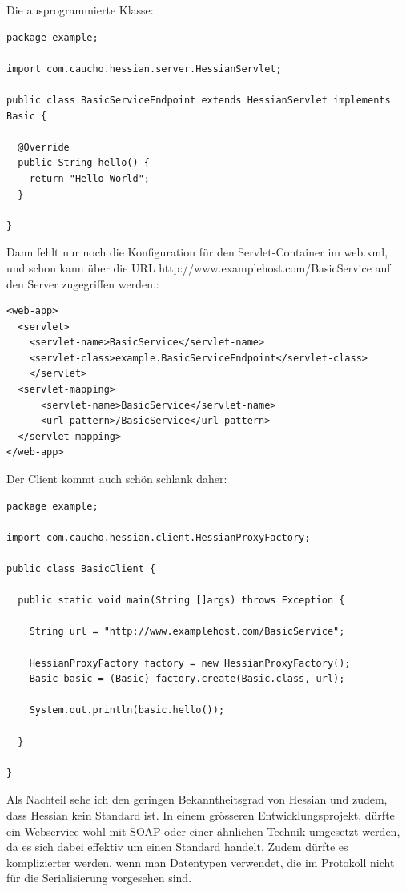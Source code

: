 \documentclass[abstracton, listof=totocnumbered,
bibliography=totocnumbered]{scrreprt}
\begin{document}
  Die ausprogrammierte Klasse:

\begin{verbatim}
package example;  
  
import com.caucho.hessian.server.HessianServlet;

public class BasicServiceEndpoint extends HessianServlet implements Basic {

  @Override
  public String hello() {
    return "Hello World";
  }
      
}
\end{verbatim}

  Dann fehlt nur noch die Konfiguration für den Servlet-Container im web.xml,
  und schon kann über die \ac{URL} http://www.examplehost.com/BasicService auf
  den Server zugegriffen werden.:
  
\begin{verbatim}
<web-app>  
  <servlet>
    <servlet-name>BasicService</servlet-name>
    <servlet-class>example.BasicServiceEndpoint</servlet-class>
    </servlet>
  <servlet-mapping>
      <servlet-name>BasicService</servlet-name>
      <url-pattern>/BasicService</url-pattern>
  </servlet-mapping>
</web-app>
\end{verbatim}

  Der Client kommt auch schön schlank daher:

\begin{verbatim}  
package example;

import com.caucho.hessian.client.HessianProxyFactory;

public class BasicClient {

  public static void main(String []args) throws Exception {
  
    String url = "http://www.examplehost.com/BasicService";

    HessianProxyFactory factory = new HessianProxyFactory();
    Basic basic = (Basic) factory.create(Basic.class, url);

    System.out.println(basic.hello());
    
  }
  
}
\end{verbatim}  
  
  Als Nachteil sehe ich den geringen Bekanntheitsgrad von Hessian und zudem,
  dass Hessian kein Standard ist. In einem grösseren Entwicklungsprojekt, dürfte
  ein Webservice wohl mit \ac{SOAP} oder einer ähnlichen Technik umgesetzt
  werden, da es sich dabei effektiv um einen Standard handelt. Zudem dürfte es
  komplizierter werden, wenn man Datentypen verwendet, die im Protokoll nicht
  für die Serialisierung vorgesehen sind.
  
\end{document}
